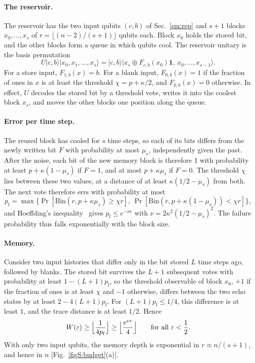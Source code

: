 \documentclass[aps,prl,twocolumn,superscriptaddress,floatfix]{revtex4-2}
\theoremstyle{plain}
\newcommand{\ket}[1]{|#1\rangle}
\begin{document}
\paragraph*{The reservoir.} The reservoir has the two input qubits $(c,b)$ of Sec.~\ref{sm:rep} and $s+1$ blocks $x_0,\dots,x_s$ of $r=\lfloor(n-2)/(s+1)\rfloor$ qubits each. Block $x_0$ holds the stored bit, and the other blocks form a queue in which qubits cool. The reservoir unitary is the basis permutation
\begin{equation}
U\ket{c,b}\ket{x_0,x_1,\dots,x_s}=\ket{c,b}\ket{x_s\oplus F_{c,b}(x_0)\bm1,\,x_0,\dots,x_{s-1}} .
\end{equation}
For a store input, $F_{1,b}(x)=b$. For a blank input, $F_{0,b}(x)=1$ if the fraction of ones in $x$ is at least the threshold $\chi=p+\kappa/2$, and $F_{0,b}(x)=0$ otherwise. In effect, $U$ decodes the stored bit by a threshold vote, writes it into the coolest block $x_s$, and moves the other blocks one position along the queue.

\paragraph*{Error per time step.} The reused block has cooled for $s$ time steps, so each of its bits differs from the newly written bit $F$ with probability at most $\mu_s$, independently given the past. After the noise, each bit of the new memory block is therefore 1 with probability at least $p+\kappa(1-\mu_s)$ if $F=1$, and at most $p+\kappa\mu_s$ if $F=0$. The threshold $\chi$ lies between these two values, at a distance of at least $\kappa(1/2-\mu_s)$ from both. The next vote therefore errs with probability at most
\begin{equation}
p_{\mathrm f}=\max\bigl\{\Pr[\mathrm{Bin}(r,p+\kappa\mu_s)\ge\chi r],\ \Pr[\mathrm{Bin}(r,p+\kappa(1-\mu_s))<\chi r]\bigr\},
\end{equation}
and Hoeffding's inequality~\cite{Hoeffding1963} gives $p_{\mathrm f}\le e^{-\nu r}$ with $\nu=2\kappa^2(1/2-\mu_s)^2$. The failure probability thus falls exponentially with the block size.

\paragraph*{Memory.} Consider two input histories that differ only in the bit stored $L$ time steps ago, followed by blanks. The stored bit survives the $L+1$ subsequent votes with probability at least $1-(L+1)p_{\mathrm f}$, so the threshold observable of block $x_0$, $+1$ if the fraction of ones is at least $\chi$ and $-1$ otherwise, differs between the two echo states by at least $2-4(L+1)p_{\mathrm f}$. For $(L+1)p_{\mathrm f}\le1/4$, this difference is at least $1$, and the trace distance is at least $1/2$. Hence
\begin{equation}
W(\varepsilon)\ge\Bigl\lfloor\frac1{4p_{\mathrm f}}\Bigr\rfloor\ge\Bigl\lfloor\frac{e^{\nu r}}4\Bigr\rfloor\qquad\text{for all }\varepsilon<\frac12 .
\end{equation}
With only two input qubits, the memory depth is exponential in $r\approx n/(s+1)$, and hence in $n$ [Fig.~\ref{figS:budget}(a)].
\end{document}
